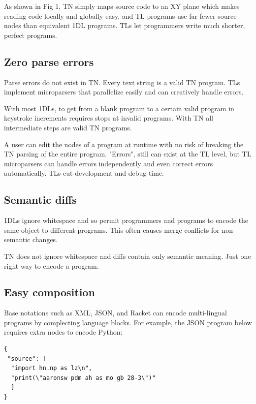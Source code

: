 \documentclass[journal]{IEEEtran}
\begin{document}
As shown in Fig 1, TN simply maps source code to an XY plane which makes reading code locally and globally easy, and TL programs use far fewer source nodes than equivalent 1DL programs. TLs let programmers write much shorter, perfect programs.

\subsection{Zero parse errors}

Parse errors do not exist in TN. Every text string is a valid TN program. TLs implement microparsers that parallelize easily and can creatively handle errors.

With most 1DLs, to get from a blank program to a certain valid program in keystroke increments requires stops at invalid programs. With TN all intermediate steps are valid TN programs.

A user can edit the nodes of a program at runtime with no risk of breaking the TN parsing of the entire program. "Errors", still can exist at the TL level, but TL microparsers can handle errors independently and even correct errors automatically. TLs cut development and debug time.

\subsection{Semantic diffs}

1DLs ignore whitespace and so permit programmers and programs to encode the same object to different programs. This often causes merge conflicts for non-semantic changes.

TN does not ignore whitespace and diffs contain only semantic meaning. Just one right way to encode a program.

\subsection{Easy composition}

Base notations such as XML\cite{Bray}, JSON\cite{Crockford}, and Racket\cite{Racket} can encode multi-lingual programs by complecting language blocks. For example, the JSON program below requires extra nodes to encode Python:

\begin{lstlisting}
{
 "source": [
  "import hn.np as lz\n",
  "print(\"aaronsw pdm ah as mo gb 28-3\")"
  ]
}
\end{lstlisting}
\end{document}
